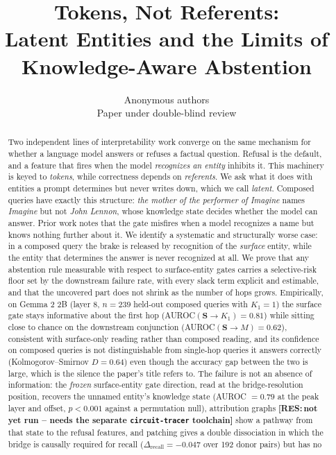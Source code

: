 \documentclass{article}
\title{Tokens, Not Referents:\\ Latent Entities and the Limits of\\ Knowledge-Aware Abstention}
\author{Anonymous authors\\Paper under double-blind review}
\newcommand{\RES}[1]{{\color{red}\textbf{[RES:\,#1]}}}
\newcommand{\gate}{\mathbf{S}}
\begin{document}
\maketitle

\begin{abstract}
Two independent lines of interpretability work converge on the same mechanism for whether a language
model answers or refuses a factual question. Refusal is the default, and a feature that fires when
the model \emph{recognizes an entity} inhibits it. This machinery is keyed to \emph{tokens}, while
correctness depends on \emph{referents}. We ask what it does with entities a prompt determines but never writes down, which we call
\emph{latent}. Composed queries have exactly this structure: \emph{the mother of the performer of
Imagine} names \emph{Imagine} but not \emph{John Lennon}, whose knowledge state decides whether the
model can answer. Prior work notes that the gate misfires when a model recognizes a name but knows
nothing further about it. We identify a systematic and structurally worse case: in a composed query
the brake is released by recognition of the \emph{surface} entity, while the entity that determines
the answer is never recognized at all. We prove that any abstention rule measurable with respect to
surface-entity gates carries a selective-risk floor set by the downstream failure rate, with every
slack term explicit and estimable, and that the uncovered
part does not shrink as the number of hops grows.
Empirically, on Gemma 2 2B (layer 8, $n{=}239$ held-out composed queries with $K_1{=}1$) the surface
gate stays informative about the first hop (AUROC$(\gate\!\to\!K_1)=0.81$) while sitting close to
chance on the downstream conjunction (AUROC$(\gate\!\to\!M)=0.62$), consistent with surface-only
reading rather than composed reading, and its confidence on composed queries is not
distinguishable from single-hop queries it answers correctly (Kolmogorov--Smirnov
$D=0.64$) even though the accuracy gap between the two is large, which is the silence the paper's
title refers to. The failure is not an absence of information: the \emph{frozen}
surface-entity gate direction, read at the bridge-resolution position, recovers the unnamed entity's
knowledge state (AUROC $=0.79$ at the peak layer and offset, $p<0.001$ against a permutation null),
attribution graphs \RES{not yet run -- needs the separate \texttt{circuit-tracer} toolchain} show a pathway from that
state to the refusal features, and patching gives a double dissociation in which the bridge is
causally required for recall ($\Delta_{\mathrm{recall}}=-0.047$ over 192 donor pairs) but has no

\end{abstract}
\end{document}
